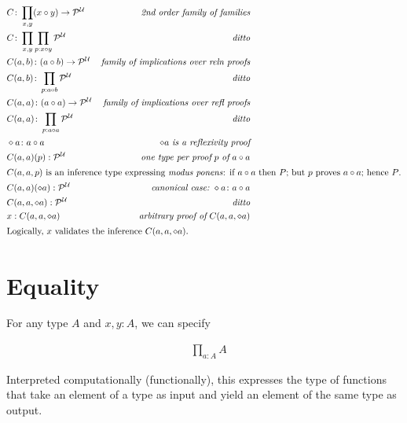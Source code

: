 \documentclass{article}
\begin{document}
\begin{align}
  &C\colon\prod\limits_{x,y}(x\circ y)\to\mathcal{P}^{\mathcal{U}} & \textit{2nd order family of families} \\
  &C\colon\prod\limits_{x,y}\prod\limits_{p{:}x\circ y}\mathcal{P}^{\mathcal{U}} & \textit{ditto} \\
  &C(a,b)\colon(a\circ b)\to\mathcal{P}^{\mathcal{U}} & \textit{family of implications over reln proofs} \\
  &C(a,b)\colon\prod\limits_{p{:}a\circ b}\mathcal{P}^{\mathcal{U}} & \textit{ditto} \\
  &C(a,a)\colon(a\circ a)\to\mathcal{P}^{\mathcal{U}} & \textit{family of implications over refl proofs} \\
  &C(a,a)\colon\prod\limits_{p{:}a\circ a}\mathcal{P}^{\mathcal{U}} & \textit{ditto} \\
  &\diamond a\colon a\circ a & \diamond a \ \textit{is a reflexivity proof} \\
  &C(a,a)(p):\mathcal{P}^{\mathcal{U}} & \textit{one type per proof}\ p\ \textit{of}\ a\circ a \\
\intertext{\(C(a,a,p)\) is an inference type expressing \textit{modus ponens}: if \(a\circ a\) then \(P\); but \(p\) proves \(a\circ a\); hence \(P\).}
  &C(a,a)(\diamond a):\mathcal{P}^{\mathcal{U}} & \textit{canonical case:}\ \diamond a\colon a\circ a \\
  &C(a,a,\diamond a):\mathcal{P}^{\mathcal{U}} & \textit{ditto} \\
&x:C(a,a,\diamond a) & \textit{arbitrary proof of}\ C(a,a,\diamond a) \\
\intertext{Logically, \(x\) validates the inference \(C(a,a,\diamond a)\).}
\end{align}


\section{Equality}

For any type \(A\) and \(x,y:A\), we can specify

\begin{align}
  &\prod\limits_{a{:}A}A
\end{align}

Interpreted computationally (functionally), this expresses
the type of functions that take an element of a type as input and
yield an element of the same type as output.
\end{document}
